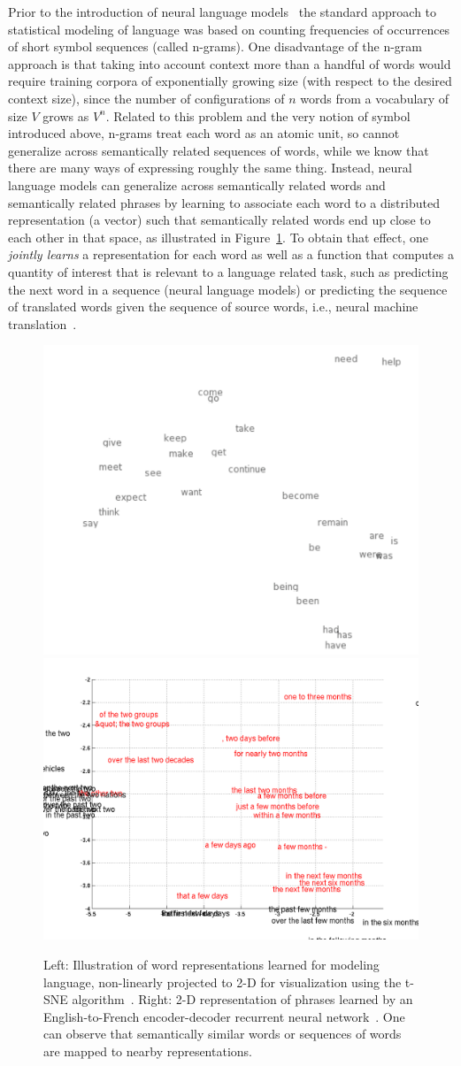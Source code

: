 \documentclass[]{article}
\begin{document}
Prior to the introduction of neural language
models~\citet{BenDucVin01-short} the standard approach to statistical
modeling of language was based on counting frequencies of occurrences of
short symbol sequences (called n-grams). One disadvantage of the n-gram
approach is that taking into account context more than a handful of words would require
training corpora of exponentially growing size (with respect to the
desired context size), since the number of configurations of $n$
words from a vocabulary of size $V$ grows as $V^n$. Related to this
problem and the very notion of symbol introduced above, n-grams
treat each word as an atomic unit, so cannot generalize across
semantically related sequences of words,
while we know that there are many ways of expressing roughly the same thing.
Instead, neural language models can generalize across semantically related words
and semantically related phrases by learning to associate each word to a
distributed representation (a vector) such that semantically related
words end up close to each other in that space, as illustrated in
Figure~\ref{fig:word-embeddings}. To obtain that effect, one
{\em jointly learns} a representation for each word as well as
a function that computes a quantity of interest that is relevant
to a language related task, such as predicting the next word
in a sequence (neural language models) or predicting the sequence
of translated words given the sequence of source words, i.e., neural
machine translation~\citep{Bahdanau-et-al-arxiv2014,Sutskever-et-al-NIPS2014}.


\begin{figure}[H]
\centerline{
\includegraphics[width=0.49\linewidth]{word-embeddings.png}
\includegraphics[width=0.49\linewidth]{phrase_zoom2.png}
}
\caption{Left: Illustration of word representations learned for modeling
language, non-linearly projected to 2-D for visualization using the
t-SNE algorithm~\citep{VanDerMaaten08}. Right: 2-D representation
of phrases learned by an English-to-French encoder-decoder recurrent
neural network~\citep{Cho-et-al-EMNLP2014}. One can observe that
semantically similar words or sequences of words are  mapped to
nearby representations.
}
\label{fig:word-embeddings}
\end{figure}
\end{document}
